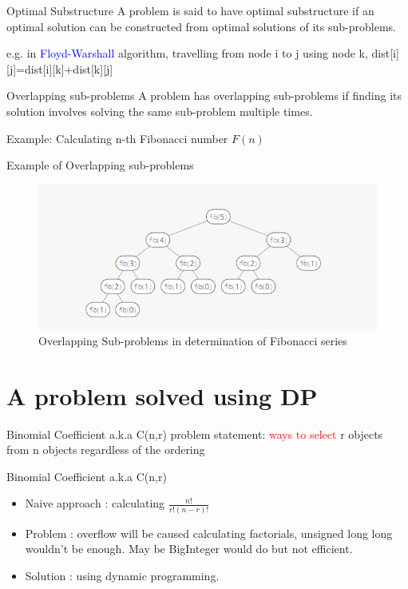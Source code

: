 \documentclass{beamer}
\begin{document}
\begin{frame}{Optimal Substructure}
    A problem is said to have optimal substructure if an optimal solution can be constructed from optimal solutions of its sub-problems.
    
    e.g. in \textcolor{blue}{Floyd-Warshall} algorithm, travelling from node i to j using node k, dist[i][j]=dist[i][k]+dist[k][j] 
\end{frame}

\begin{frame}{Overlapping sub-problems}
    A problem has overlapping sub-problems if finding its solution involves solving the same sub-problem multiple times.
    
    Example: Calculating n-th Fibonacci number $F(n)$
    
\end{frame}

\begin{frame}{Example of Overlapping sub-problems}
    \begin{figure}[H]
	\centering
	\captionsetup{justification=centering}
	\includegraphics[width = 1\textwidth]{image/fib.PNG}
	\caption{
		Overlapping Sub-problems in determination of Fibonacci series
	}
	\label{fig:fib}
	
\end{figure}
\end{frame}


\section{A problem solved using DP}


\begin{frame}{Binomial Coefficient a.k.a C(n,r)}
    problem statement: \textcolor{red}{ways to select} r objects from n objects regardless of the ordering
\end{frame}

\begin{frame}{Binomial Coefficient a.k.a C(n,r)}
    \begin{itemize}
        \item <1-> Naive approach : calculating $\frac{n!}{r!(n-r)!}$
        \item <2-> Problem : overflow will be caused calculating factorials, unsigned long long wouldn't be enough. May be BigInteger would do but not
        efficient.
        \item <3-> Solution : using dynamic programming.
    \end{itemize}
\end{frame}
\end{document}
